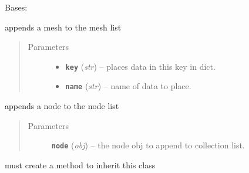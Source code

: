 \documentclass[letterpaper,10pt,english]{sphinxmanual}
\begin{document}
\begin{fulllineitems}
\label{zBuilder:zBuilder.nodeCollection.NodeCollection}
Bases: 

\begin{fulllineitems}
\label{zBuilder:zBuilder.nodeCollection.NodeCollection.add_data}
appends a mesh to the mesh list
\begin{quote}\begin{description}
\item[{Parameters}] \leavevmode\begin{itemize}
\item {} 
\textbf{\texttt{key}} (\emph{str}) -- places data in this key in dict.

\item {} 
\textbf{\texttt{name}} (\emph{str}) -- name of data to place.

\end{itemize}

\end{description}\end{quote}

\end{fulllineitems}


\begin{fulllineitems}
\label{zBuilder:zBuilder.nodeCollection.NodeCollection.add_node}
appends a node to the node list
\begin{quote}\begin{description}
\item[{Parameters}] \leavevmode
\textbf{\texttt{node}} (\emph{obj}) -- the node obj to append to collection list.

\end{description}\end{quote}

\end{fulllineitems}


\begin{fulllineitems}
\label{zBuilder:zBuilder.nodeCollection.NodeCollection.apply}
must create a method to inherit this class


\end{fulllineitems}
\end{fulllineitems}
\end{document}
